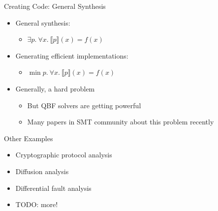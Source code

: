\documentclass[ignorenonframetext,]{beamer}
\providecommand{\tightlist}{%
  \setlength{\itemsep}{0pt}\setlength{\parskip}{0pt}}
\begin{document}
\begin{frame}{Creating Code: General Synthesis}

\begin{itemize}
\tightlist
\item
  General synthesis:

  \begin{itemize}
  \tightlist
  \item
    \(\exists p.~\forall x.~\llbracket{}p\rrbracket{}(x) = f(x)\)
  \end{itemize}
\item
  Generating efficient implementations:

  \begin{itemize}
  \tightlist
  \item
    \(\min p.~\forall x.~\llbracket{}p\rrbracket{}(x) = f(x)\)
  \end{itemize}
\item
  Generally, a hard problem

  \begin{itemize}
  \tightlist
  \item
    But QBF solvers are getting powerful
  \item
    Many papers in SMT community about this problem recently
  \end{itemize}
\end{itemize}

\end{frame}

\begin{frame}{Other Examples}

\begin{itemize}
\tightlist
\item
  Cryptographic protocol analysis
\item
  Diffusion analysis
\item
  Differential fault analysis
\item
  TODO: more!
\end{itemize}

\end{frame}
\end{document}

